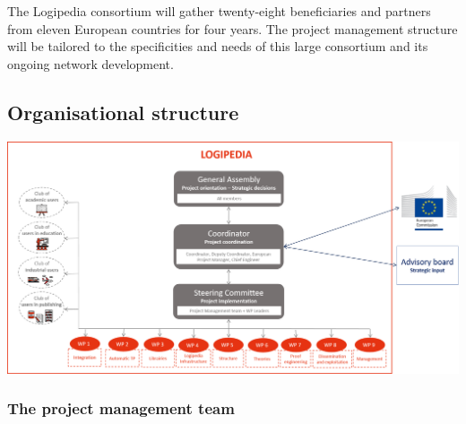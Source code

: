 The Logipedia consortium will gather twenty-eight beneficiaries and partners
from eleven European countries for four years. The project management
structure will be tailored to the specificities and needs of this
large consortium and its ongoing network development.

\subsection*{Organisational structure}

\includegraphics[width=\textwidth]{img/Gouvernance}

\subsubsection*{The project management team}

